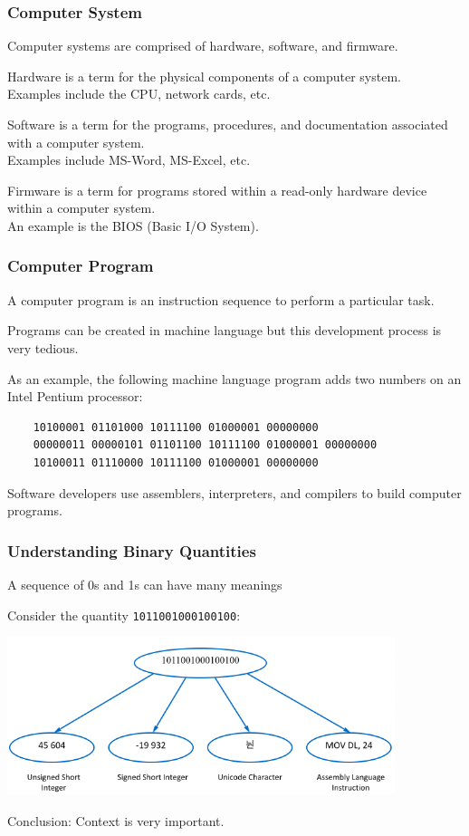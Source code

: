 \begin{frame}
\frametitle{Computer System}

Computer systems are comprised of hardware, software, and firmware.

\alert{Hardware} is a term for the physical components of a computer system. \\
\quad Examples include the CPU, network cards, etc. 

\alert{Software} is a term for the programs, procedures, and documentation associated with a computer system.\\
\quad Examples include MS-Word, MS-Excel, etc.

\alert{Firmware} is a term for programs stored within a read-only hardware device within a computer system.\\
\quad An example is the BIOS (Basic I/O System).


\end{frame}

\begin{frame}[fragile]
\frametitle{Computer Program}

A computer program is an instruction sequence to perform a particular task.

Programs can be created in machine language but this development process is very tedious.

As an example, the following machine language program adds two numbers on an Intel Pentium processor:
\begin{center}
{\small
\begin{verbatim}
	10100001 01101000 10111100 01000001 00000000
	00000011 00000101 01101100 10111100 01000001 00000000
	10100011 01110000 10111100 01000001 00000000
\end{verbatim}
}
\end{center}

Software developers use assemblers, interpreters, and compilers to build computer programs.

\end{frame}

\begin{frame}
\frametitle{Understanding Binary Quantities}
A sequence of 0s and 1s can have many meanings

Consider the quantity \texttt{1011001000100100}:

\begin{center}
\includegraphics[width=0.85\textwidth]{images/binary.png}
\end{center}

Conclusion: \alert{Context is very important}.

\end{frame}

